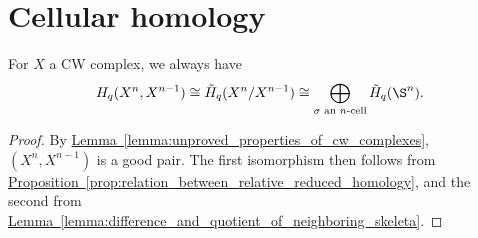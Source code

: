 \documentclass[main.tex]{subfiles}
\begin{document}
\section{Cellular homology}
\label{sec:cellular_homology}

\begin{lemma}
  \label{lemma:relative_homology_of_skeleta_trivial}
  For $X$ a CW complex, we always have
  \begin{equation*}
    H_{q}(X^{n}, X^{n-1}) \cong \tilde{H}_{q}(X^{n}/X^{n-1}) \cong \bigoplus_{\sigma \text{ an $n$-cell}} \tilde{H}_{q}(\S^{n}).
  \end{equation*}
\end{lemma}
\begin{proof}
  By \hyperref[lemma:unproved_properties_of_cw_complexes]{Lemma~\ref*{lemma:unproved_properties_of_cw_complexes}}, $(X^{n}, X^{n-1})$ is a good pair. The first isomorphism then follows from \hyperref[prop:relation_between_relative_reduced_homology]{Proposition~\ref*{prop:relation_between_relative_reduced_homology}}, and the second from \hyperref[lemma:difference_and_quotient_of_neighboring_skeleta]{Lemma~\ref*{lemma:difference_and_quotient_of_neighboring_skeleta}}.
\end{proof}
\end{document}

